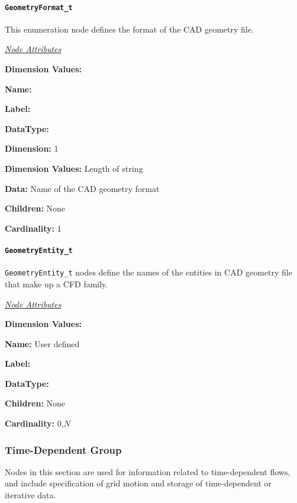 \paragraph{\texttt{GeometryFormat\_t}}

This enumeration node defines the format of the CAD geometry file.

\textit{\uline{Node Attributes}}
\begin{Ventryic}{\textbf{Dimension Values:}}
\item [\textbf{Name:}]
\item [\textbf{Label:}]
\item [\textbf{DataType:}]
\item [\textbf{Dimension:}]
      1
\item [\textbf{Dimension Values:}]
      Length of string
\item [\textbf{Data:}]
      Name of the CAD geometry format
\item [\textbf{Children:}]
      None
\item [\textbf{Cardinality:}]
      1
\end{Ventryic}

\paragraph{\texttt{GeometryEntity\_t}}

\texttt{GeometryEntity\_t} nodes define the names of the
entities in CAD geometry file that make up a CFD family.

\textit{\uline{Node Attributes}}
\begin{Ventryic}{\textbf{Dimension Values:}}
\item [\textbf{Name:}]
      User defined
\item [\textbf{Label:}]
\item [\textbf{DataType:}]
\item [\textbf{Children:}]
      None
\item [\textbf{Cardinality:}]
      0,$N$
\end{Ventryic}

\subsubsection{Time-Dependent Group}
\label{s:timedep}

Nodes in this section are used for information related to time-dependent
flows, and include specification of grid motion and storage of
time-dependent or iterative data.

